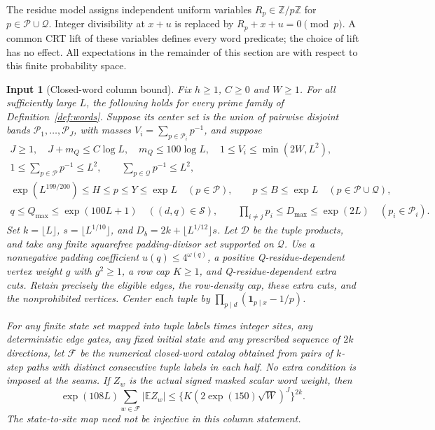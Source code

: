 \documentclass[11pt]{article}
\newtheorem{inputthm}[theorem]{Input}
\theoremstyle{definition}
\newcommand{\E}{\mathbb E}
\newcommand{\Z}{\mathbb Z}
\newcommand{\ind}{\mathbf 1}
\newcommand{\abs}[1]{\left\lvert#1\right\rvert}
\begin{document}
The residue model assigns independent uniform variables
$R_p\in\Z/p\Z$ for $p\in\mathcal P\cup\mathcal Q$.
Integer divisibility at $x+u$ is replaced by $R_p+x+u=0\pmod p$.
A common CRT lift of these variables defines every word predicate; the
choice of lift has no effect. All expectations in the remainder of this
section are with respect to this finite probability space.

\begin{inputthm}[Closed-word column bound]\label{input:trace}
Fix $h\ge1$, $C\ge0$ and $W\ge1$. For all sufficiently large $L$, the
following holds for every prime family of Definition~\ref{def:words}.
Suppose its center set is the union of pairwise disjoint bands
$\mathcal P_1,\ldots,\mathcal P_J$, with masses
$V_i=\sum_{p\in\mathcal P_i}p^{-1}$, and suppose
\begin{gather}
 J\ge1,\quad J+m_Q\le C\log L,\quad m_Q\le100\log L,
 \quad1\le V_i\le\min(2W,L^2),\label{eq:tracehyp1}\\
 1\le\sum_{p\in\mathcal P}p^{-1}\le L^2,
 \qquad\sum_{p\in\mathcal Q}p^{-1}\le L^2,\label{eq:tracehyp2}\\
 \exp(L^{199/200})\le H\le p\le Y\le\exp L
       \quad(p\in\mathcal P),\qquad
 p\le B\le\exp L\quad(p\in\mathcal P\cup\mathcal Q),\label{eq:tracehyp3}\\
 q\le Q_{\max}\le\exp(100L+1)\quad((d,q)\in\mathcal S),
 \qquad\prod_{i\ne j}p_i\le D_{\max}\le\exp(2L)
       \quad(p_i\in\mathcal P_i).\label{eq:tracehyp4}
\end{gather}
Set $k=\lfloor L\rfloor$, $s=\lfloor L^{1/10}\rfloor$, and
$D_b=2k+\lfloor L^{1/12}\rfloor s$.
Let $\mathcal D$ be the tuple products, and take any finite squarefree
padding-divisor set supported on $\mathcal Q$.
Use a nonnegative padding coefficient $u(q)\le4^{\omega(q)}$, a
positive Q-residue-dependent vertex weight $g$ with $g^2\ge1$, a row cap
$K\ge1$, and Q-residue-dependent extra cuts. Retain precisely the
eligible edges, the row-density cap, these extra cuts, and the
nonprohibited vertices. Center each tuple by
$\prod_{p\mid d}(\ind_{p\mid x}-1/p)$.

For any finite state set mapped into tuple labels times integer sites,
any deterministic edge gates, any fixed initial state and any prescribed
sequence of $2k$ directions, let $\mathcal F$ be the numerical closed-word
catalog obtained from pairs of $k$-step paths with distinct consecutive
tuple labels in each half. No extra condition is imposed at the seams.
If $Z_w$ is the actual signed masked scalar word weight, then
\begin{equation}\label{eq:wordmajorant}
 \exp(108L)\sum_{w\in\mathcal F}\abs{\E Z_w}
 \le\{K(2\exp(150)\sqrt W)^J\}^{2k}.
\end{equation}
The state-to-site map need not be injective in this column statement.
\end{inputthm}
\end{document}
